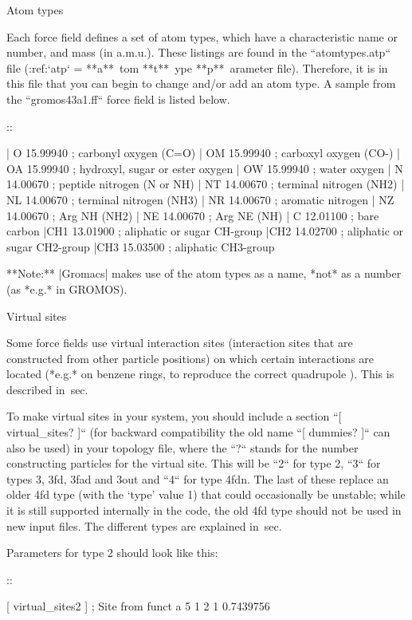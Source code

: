 Atom types
~~~~~~~~~~

Each force field defines a set of atom
types,
which have a characteristic name or number, and mass (in a.m.u.). These
listings are found in the ``atomtypes.atp`` file (:ref:`atp` =
**a**\ tom **t**\ ype **p**\ arameter file). Therefore, it is in this
file that you can begin to change and/or add an atom type. A sample from
the ``gromos43a1.ff`` force field is listed below.

::

     |  O  15.99940 ;     carbonyl oxygen (C=O)
     | OM  15.99940 ;     carboxyl oxygen (CO-)
     | OA  15.99940 ;     hydroxyl, sugar or ester oxygen
     | OW  15.99940 ;     water oxygen
     |  N  14.00670 ;     peptide nitrogen (N or NH)
     | NT  14.00670 ;     terminal nitrogen (NH2)
     | NL  14.00670 ;     terminal nitrogen (NH3)
     | NR  14.00670 ;     aromatic nitrogen
     | NZ  14.00670 ;     Arg NH (NH2)
     | NE  14.00670 ;     Arg NE (NH)
     |  C  12.01100 ;     bare carbon
     |CH1  13.01900 ;     aliphatic or sugar CH-group
     |CH2  14.02700 ;     aliphatic or sugar CH2-group
     |CH3  15.03500 ;     aliphatic CH3-group

**Note:** |Gromacs| makes use of the atom types as a name, *not* as a
number (as *e.g.* in GROMOS).

Virtual sites
~~~~~~~~~~~~~

Some force fields use virtual interaction
sites
(interaction sites
that are constructed from other particle positions) on which certain
interactions are located (*e.g.* on benzene rings, to reproduce the
correct quadrupole
). This is described
in sec. 

To make virtual sites in your system, you should include a section
``[ virtual_sites? ]`` (for backward compatibility the old
name ``[ dummies? ]`` can also be used) in your topology
file, where the ``?`` stands for the number constructing
particles for the virtual site. This will be ``2`` for
type 2, ``3`` for types 3, 3fd, 3fad and 3out and
``4`` for type 4fdn. The last of these replace an older
4fd type (with the ‘type’ value 1) that could occasionally be unstable;
while it is still supported internally in the code, the old 4fd type
should not be used in new input files. The different types are explained
in sec. 

Parameters for type 2 should look like this:

::

    [ virtual_sites2 ]
    ; Site  from        funct  a
    5       1     2     1      0.7439756

